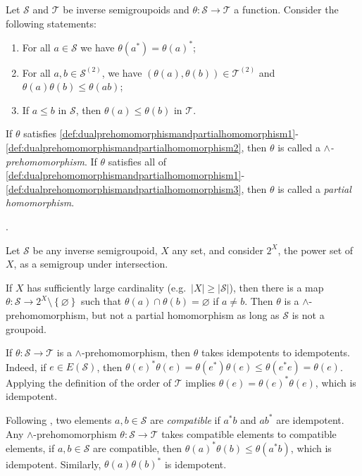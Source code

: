 \begin{definition}\label{def:dualprehomomorphismandpartialhomomorphism}
Let $\mathcal{S}$ and $\mathcal{T}$ be inverse semigroupoids and $\theta\colon\mathcal{S}\to\mathcal{T}$ a function. Consider the following statements:
\begin{enumerate}[label=(\roman*)]
\item\label{def:dualprehomomorphismandpartialhomomorphism1} For all $a\in\mathcal{S}$ we have $\theta(a^*)=\theta(a)^*$;
\item\label{def:dualprehomomorphismandpartialhomomorphism2} For all $a,b\in\mathcal{S}^{(2)}$, we have $(\theta(a),\theta(b))\in\mathcal{T}^{(2)}$ and $\theta(a)\theta(b)\leq\theta(ab)$;
\item\label{def:dualprehomomorphismandpartialhomomorphism3} If $a\leq b$ in $\mathcal{S}$, then $\theta(a)\leq\theta(b)$ in $\mathcal{T}$.
\end{enumerate}
If $\theta$ satisfies \ref{def:dualprehomomorphismandpartialhomomorphism1}-\ref{def:dualprehomomorphismandpartialhomomorphism2}, then $\theta$ is called a \emph{$\land$-prehomomorphism}. If $\theta$ satisfies all of \ref{def:dualprehomomorphismandpartialhomomorphism1}-\ref{def:dualprehomomorphismandpartialhomomorphism3}, then $\theta$ is called a \emph{partial homomorphism}.
\end{definition}.

\begin{example}
Let $\mathcal{S}$ be any inverse semigroupoid, $X$ any set, and consider $2^X$, the power set of $X$, as a semigroup under intersection.

If $X$ has sufficiently large cardinality (e.g.\ $|X|\geq|\mathcal{S}|$), then there is a map $\theta\colon\mathcal{S}\to 2^X\setminus\left\{\varnothing\right\}$ such that $\theta(a)\cap\theta(b)=\varnothing$ if $a\neq b$. Then $\theta$ is a $\land$-prehomomorphism, but not a partial homomorphism as long as $\mathcal{S}$ is not a groupoid.
\end{example}

If $\theta\colon\mathcal{S}\to\mathcal{T}$ is a $\land$-prehomomorphism, then $\theta$ takes idempotents to idempotents. Indeed, if $e\in E(\mathcal{S})$, then $\theta(e)^*\theta(e)=\theta(e^*)\theta(e)\leq\theta(e^*e)=\theta(e)$. Applying the definition of the order of $\mathcal{T}$ implies $\theta(e)=\theta(e)^*\theta(e)$, which is idempotent.

Following \cite[p.\ 12]{MR1694900}, two elements $a,b\in\mathcal{S}$ are \emph{compatible} if $a^*b$ and $ab^*$ are idempotent. Any $\land$-prehomomorphism $\theta\colon\mathcal{S}\to\mathcal{T}$ takes compatible elements to compatible elements, if $a,b\in\mathcal{S}$ are compatible, then $\theta(a)^*\theta(b)\leq\theta(a^*b)$, which is idempotent. Similarly, $\theta(a)\theta(b)^*$ is idempotent.

